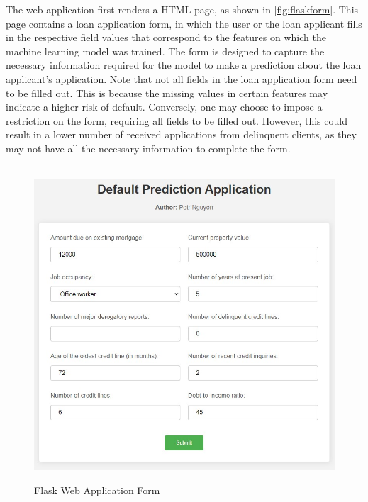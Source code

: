 The web application first renders a HTML page, as shown in \autoref{fig:flaskform}.
This page contains a loan application form, in which the user or the loan applicant fills in the respective field values that correspond to the features on which the machine learning model was trained.
The form is designed to capture the necessary information required for the model to make a prediction about the loan applicant's application.
Note that not all fields in the loan application form need to be filled out. This is because the missing values in certain features may indicate a higher risk of default. Conversely, one may choose to impose a restriction on the form, requiring all fields to be filled out. However, this could result in a lower number of received applications from delinquent clients, as they may not have all the necessary information to complete the form.
\begin{figure}[H]
\centering
\caption{Flask Web Application Form}\vspace{0.5em}
\label{fig:flaskform}\
\includegraphics[width=140mm]{Figures/flask_app_form.jpg}

\vspace{-1em}
\end{figure}
\clearpage

